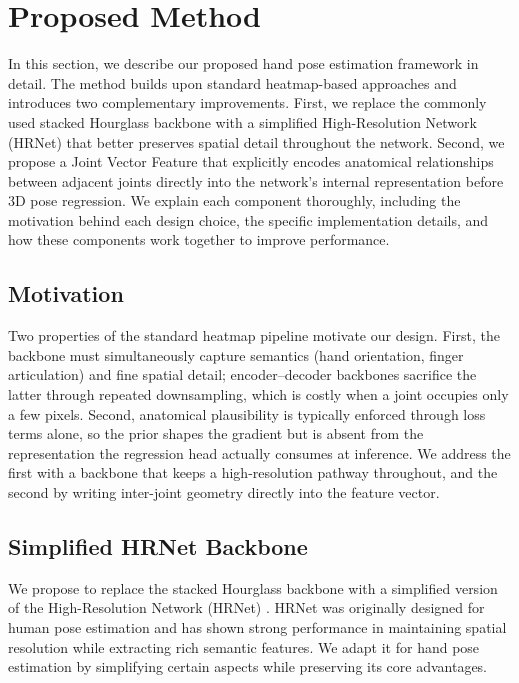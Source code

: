 \section{Proposed Method}
In this section, we describe our proposed hand pose estimation framework in detail. The method builds upon standard heatmap-based approaches and introduces two complementary improvements. First, we replace the commonly used stacked Hourglass backbone with a simplified High-Resolution Network (HRNet) that better preserves spatial detail throughout the network. Second, we propose a Joint Vector Feature that explicitly encodes anatomical relationships between adjacent joints directly into the network's internal representation before 3D pose regression. We explain each component thoroughly, including the motivation behind each design choice, the specific implementation details, and how these components work together to improve performance.

\subsection{Motivation}
Two properties of the standard heatmap pipeline motivate our design. First, the backbone must simultaneously capture semantics (hand orientation, finger articulation) and fine spatial detail; encoder--decoder backbones sacrifice the latter through repeated downsampling, which is costly when a joint occupies only a few pixels. Second, anatomical plausibility is typically enforced through loss terms alone, so the prior shapes the gradient but is absent from the representation the regression head actually consumes at inference. We address the first with a backbone that keeps a high-resolution pathway throughout, and the second by writing inter-joint geometry directly into the feature vector.

\subsection{Simplified HRNet Backbone}
\label{subsec:hrnet_backbone}
\label{subsec:hrnet}
We propose to replace the stacked Hourglass backbone with a simplified version of the High-Resolution Network (HRNet) \cite{sun2019hrnet, cheng2020higherhrnet}. HRNet was originally designed for human pose estimation and has shown strong performance in maintaining spatial resolution while extracting rich semantic features. We adapt it for hand pose estimation by simplifying certain aspects while preserving its core advantages.

